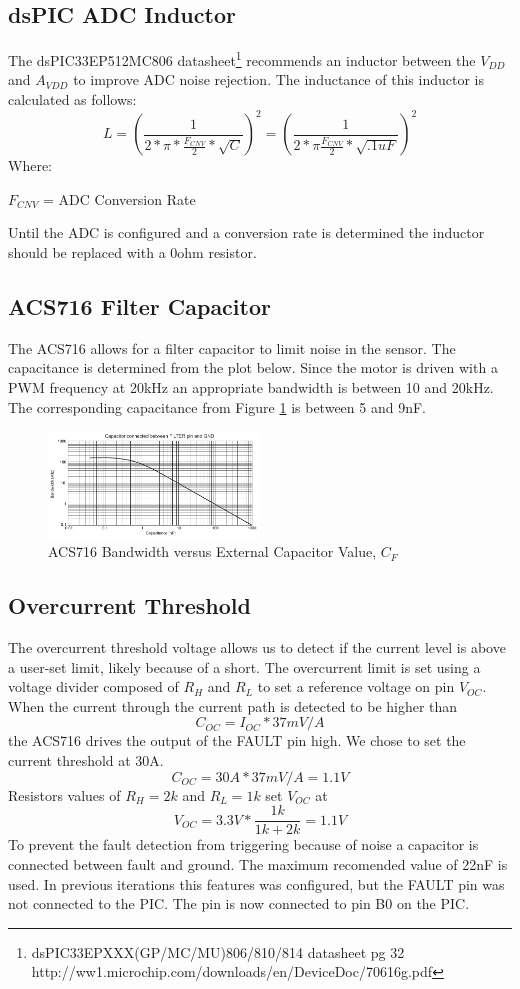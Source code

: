 \documentclass{article}
\begin{document}
\subsection{dsPIC ADC Inductor}
The dsPIC33EP512MC806 datasheet\footnote{\raggedright dsPIC33EPXXX(GP/MC/MU)806/810/814 datasheet pg 32 http://ww1.microchip.com/downloads/en/DeviceDoc/70616g.pdf} 
recommends an inductor between the $V_{DD}$ and $A_{VDD}$ to improve ADC noise rejection. The inductance of this inductor is calculated as follows: \[ L = \left(\frac{1}{2*\pi*\frac{F_{CNV}}{2}*\sqrt{C}} \right)^2 = \left(\frac{1}{2*\pi\frac{F_{CNV}}{2}*\sqrt{.1uF}} \right)^2\]
Where: 

$F_{CNV}$ = ADC Conversion Rate

Until the ADC is configured and a conversion rate is determined the inductor should be replaced with a 0ohm resistor. 
\subsection{ACS716 Filter Capacitor}
The ACS716 allows for a filter capacitor to limit noise in the sensor. The capacitance is determined from the plot below. Since the motor is driven with a PWM frequency at 20kHz an appropriate bandwidth is between 10 and 20kHz. The corresponding capacitance from Figure \ref{fig:filter} is between 5 and 9nF.
\begin{figure}[h]
	\centering
	\includegraphics[width=0.5\textwidth]{acs716filter}
	\caption{ACS716 Bandwidth versus External Capacitor Value, $C_F$\protect\footnotemark}
	\label{fig:filter}
\end{figure}
\subsection{Overcurrent Threshold}
The overcurrent threshold voltage allows us to detect if the current level is above a user-set limit, likely because of a short. The overcurrent limit is set using a voltage divider composed of $R_H$ and $R_L$ to set a reference voltage on pin $V_{OC}$. When the current through the current path is detected to be higher than 
\[C_{OC} = I_{OC}*37mV/A\] 
the ACS716 drives the output of the FAULT pin high. We chose to set the current threshold at 30A. 
\[C_{OC} = 30A*37mV/A=1.1V\] 
Resistors values of $R_H=2k$ and $R_L=1k$ set $V_{OC}$ at 
\[V_{OC} = 3.3V*\frac{1k}{1k+2k}=1.1V\]
To prevent the fault detection from triggering because of noise a capacitor is connected between fault and ground. The maximum recomended value of 22nF is used.
In previous iterations this features was configured, but the FAULT pin was not connected to the PIC. The pin is now connected to pin B0 on the PIC.
\end{document}
